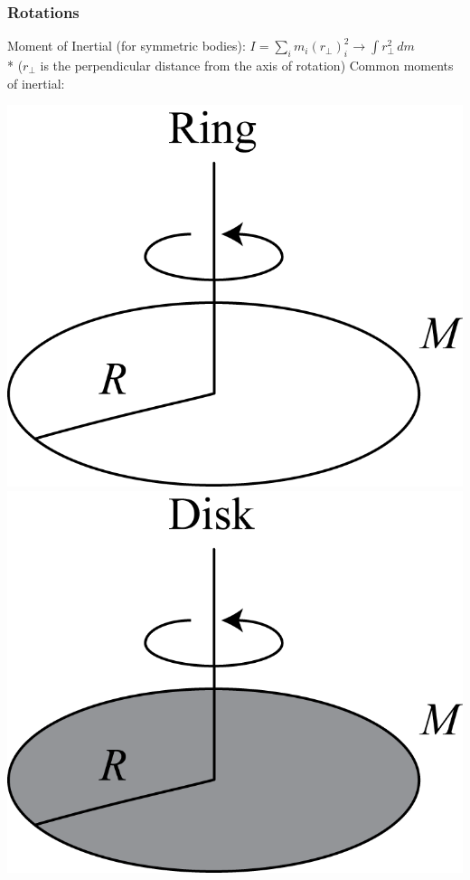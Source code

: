 \subsubsection{Rotations}
Moment of Inertial (for symmetric bodies): \(I=\sum_im_i(r_{\bot})_i^2 \to \int r_{\bot}^2\,dm\)\\*
(\(r_{\bot}\) is the perpendicular distance from the axis of rotation)
\newpage
Common moments of inertial:
\begin{center}
 \includegraphics[scale=0.5]{images/PGRE_Figures_1p1p2_Ring.png}
 \includegraphics[scale=0.5]{images/PGRE_Figures_1p1p2_Disk.png}

\end{center}
